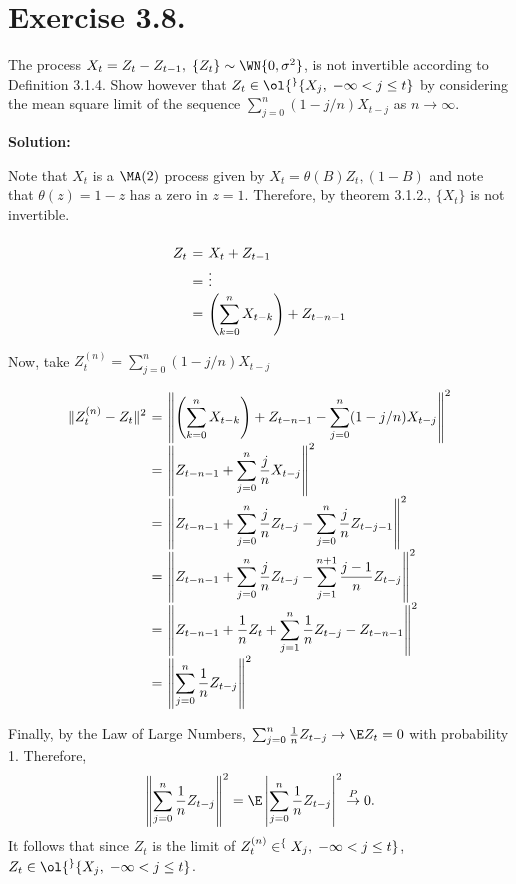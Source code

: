 \section*{Exercise 3.8.}

The process $X_t = Z_t - Z_{t-1},\; \{Z_t\} \sim \WN\{0,\sigma^2\}$, is not invertible according to Definition 3.1.4. Show however that $Z_t \in \ol{\sp} \{ X_j,\; -\infty < j \leq t\}$ by considering the mean square limit of the sequence $\sum_{j = 0}^n (1-j/n)X_{t-j}$ as $n\to \infty$.

\textbf{Solution:}

Note that $X_t$ is a $\MA(2)$ process given by
$X_t = \theta(B) Z_t, (1- B)$
and note that $\theta(z) = 1-z$ has a zero in $z = 1$. Therefore, by theorem 3.1.2., $\{X_t\}$ is not invertible.

\[ \everymath{\displaystyle}
\arraycolsep=1.8pt\def\arraystretch{1.5}
\begin{array}{rcl}
    Z_t & = & X_t + Z_{t-1}\\
    & = & \vdots\\
    & = & \left( \sum_{k = 0}^{n} X_{t-k} \right) + Z_{t-n-1}
\end{array} \]

Now, take $Z_t^{(n)} = \sum_{j = 0}^n (1-j/n)X_{t-j}$

\[ \everymath{\displaystyle}
\arraycolsep=1.8pt\def\arraystretch{2.5}
\begin{array}{rcl}
    \|Z_t^{(n)} - Z_t\|^{2} & = & \left\| \left( \sum_{k = 0}^{n} X_{t-k} \right) + Z_{t-n-1} -  \sum_{j = 0}^n (1-j/n)X_{t-j}\right\|^{2}\\
    & = & \left\| Z_{t-n-1} + \sum_{j = 0}^n \frac{j}{n} X_{t-j}\right\|^{2}\\
    & = & \left\| Z_{t-n-1} + \sum_{j = 0}^n \frac{j}{n} Z_{t-j} - \sum_{j = 0}^n \frac{j}{n} Z_{t-j-1} \right\|^{2}\\
    & = & \left\| Z_{t-n-1} + \sum_{j = 0}^n \frac{j}{n} Z_{t-j} - \sum_{j = 1}^{n+1} \frac{j-1}{n} Z_{t-j} \right\|^{2}\\
    & = & \left\| Z_{t-n-1}  + \frac{1}{n} Z_{t}+ \sum_{j = 1}^n \frac{1}{n} Z_{t-j} -  Z_{t-n-1} \right\|^{2}\\
    & = & \left\| \sum_{j = 0}^n \frac{1}{n} Z_{t-j} \right\|^{2}\\
\end{array} \]

Finally, by the Law of Large Numbers, $\sum_{j = 0}^n \frac{1}{n} Z_{t-j} \to \E Z_t = 0$ with probability 1. Therefore,
\[ \left\| \sum_{j = 0}^n \frac{1}{n} Z_{t-j} \right\|^{2} = \E \left| \sum_{j = 0}^n \frac{1}{n} Z_{t-j} \right|^2 \overset{P}{\to} 0. \]
It follows that since $Z_t$ is the limit of $Z_t^{(n)} \in \sp\{ X_j,\; -\infty < j \leq t\}$, $Z_t \in \ol{\sp}\{ X_j,\; -\infty < j \leq t\}$.